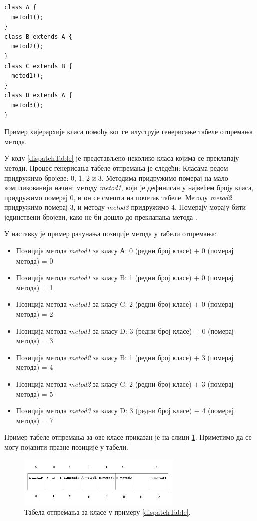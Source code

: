 \documentclass[12pt,oneside]{memoir}
\begin{document}
\begin{listing}
\begin{verbatim}
class A {
  metod1();
}
class B extends A {
  metod2();
}
class C extends B {
  metod1();
}
class D extends A {
  metod3();
}
\end{verbatim}
\caption{Пример хијерархије класа помоћу ког се илуструје генерисање табеле отпремања метода.}
\label{dispatchTable}
\end{listing}

У коду \ref{dispatchTable} је представљено неколико класа којима се преклапају методи. Процес генерисања табеле отпремања је следећи: Класама редом придружимо бројеве: 0, 1, 2 и 3. Методима придружимо померај на мало компликованији начин: методу \textit{metod1}, који је дефинисан у највећем броју класа, придружимо померај 0, и он се смешта на почетак табеле. Методу \textit{metod2} придружимо померај 3, и методу \textit{metod3} придружимо 4. Померају морају бити јединствени бројеви, како не би дошло до преклапања метода \cite{Dartino}.

У наставку је пример рачунања позиције метода у табели отпремања:
\begin{itemize}
\item Позиција метода \textit{metod1} за класу А: 0 (редни број класе) + 0 (померај метода) = 0
\item Позиција метода \textit{metod1} за класу B: 1 (редни број класе) + 0 (померај метода) = 1
\item Позиција метода \textit{metod1} за класу C: 2 (редни број класе) + 0 (померај метода) = 2
\item Позиција метода \textit{metod1} за класу D: 3 (редни број класе) + 0 (померај метода) = 3
\item Позиција метода \textit{metod2} за класу B: 1 (редни број класе) + 3 (померај метода) = 4
\item Позиција метода \textit{metod2} за класу C: 2 (редни број класе) + 3 (померај метода) = 5
\item Позиција метода \textit{metod3} за класу D: 3 (редни број класе) + 4 (померај метода) = 7
\end{itemize}

Пример табеле отпремања за ове класе приказан је на слици \ref{fig:otpremanje}. Приметимо да се могу појавити празне позиције у табели.

\begin{figure}[!ht]
  \centering
  \includegraphics[width=0.7\textwidth]{otpremanje.jpg}
  \caption{Табела отпремања за класе у примеру \ref{dispatchTable}.}
  \label{fig:otpremanje}
\end{figure}
\end{document}
